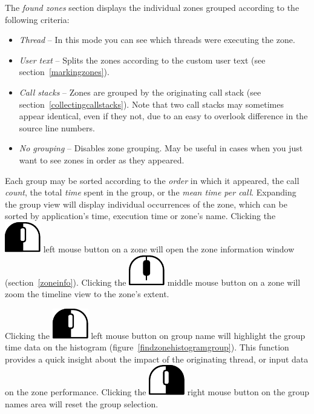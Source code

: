 \documentclass[hidelinks,titlepage,a4paper]{article}
\newcommand{\LMB}{\includegraphics[height=.8\baselineskip]{icons/lmb}}
\newcommand{\RMB}{\includegraphics[height=.8\baselineskip]{icons/rmb}}
\newcommand{\MMB}{\includegraphics[height=.8\baselineskip]{icons/mmb}}
\begin{document}
The \emph{found zones} section displays the individual zones grouped according to the following criteria:

\begin{itemize}
\item \emph{Thread} -- In this mode you can see which threads were executing the zone.
\item \emph{User text} -- Splits the zones according to the custom user text (see section~\ref{markingzones}).
\item \emph{Call stacks} -- Zones are grouped by the originating call stack (see section~\ref{collectingcallstacks}). Note that two call stacks may sometimes appear identical, even if they not, due to an easy to overlook difference in the source line numbers.
\item \emph{No grouping} -- Disables zone grouping. May be useful in cases when you just want to see zones in order as they appeared.
\end{itemize}

Each group may be sorted according to the \emph{order} in which it appeared, the call \emph{count}, the total \emph{time} spent in the group, or the \emph{mean time per call}. Expanding the group view will display individual occurrences of the zone, which can be sorted by application's time, execution time or zone's name. Clicking the \LMB{} left mouse button on a zone will open the zone information window (section~\ref{zoneinfo}). Clicking the \MMB{} middle mouse button on a zone will zoom the timeline view to the zone's extent.

Clicking the \LMB{} left mouse button on group name will highlight the group time data on the histogram (figure~\ref{findzonehistogramgroup}). This function provides a quick insight about the impact of the originating thread, or input data on the zone performance. Clicking the \RMB{} right mouse button on the group names area will reset the group selection.
\end{document}
